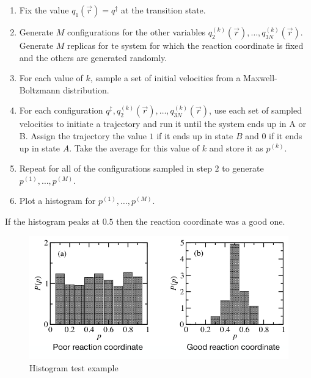 	\begin{enumerate}
		\item Fix the value $q_1(\vec{r}) = q^{\ddagger}$ at the transition state.
		\item Generate $M$ configurations for the other variables $q_2^{(k)}(\vec{r}), \dots, q_{3N}^{(k)}(\vec{r})$.
			Generate $M$ replicas for te system for which the reaction coordinate is fixed and the others are generated randomly.
		\item For each value of $k$, sample a set of initial velocities from a Maxwell-Boltzmann distribution.
		\item For each configuration $q^{\ddagger}, q_2^{(k)}(\vec{r}), \dots, q_{3N}^{(k)}(\vec{r})$, use each set of sampled velocities to initiate a trajectory and run it until the system ends up in A or B.
			Assign the trajectory the value $1$ if it ends up in state $B$ and $0$ if it ends up in state $A$.
			Take the average for this value of $k$ and store it as $p^{(k)}$.
		\item Repeat for all of the configurations sampled in step $2$ to generate $p^{(1)}, \dots, p^{(M)}$.
		\item Plot a histogram for $p^{(1)}, \dots, p^{(M)}$.
	\end{enumerate}

	If the histogram peaks at $0.5$ then the reaction coordinate was a good one.

	\begin{figure}[H]
		\includegraphics[width=\textwidth]{histogram-test}
		\caption{Histogram test example}
		\label{fig:histogram-test}
	\end{figure}
